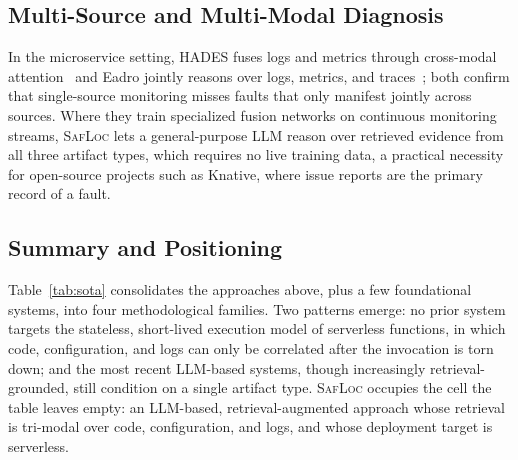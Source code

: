\documentclass[runningheads]{llncs}
\begin{document}
\subsection{Multi-Source and Multi-Modal Diagnosis}

In the microservice setting, HADES fuses logs and metrics through cross-modal attention~\cite{lee2023hades} and Eadro jointly reasons over logs, metrics, and traces~\cite{lee2023eadro}; both confirm that single-source monitoring misses faults that only manifest jointly across sources. Where they train specialized fusion networks on continuous monitoring streams, \textsc{SafLoc} lets a general-purpose LLM reason over retrieved evidence from all three artifact types, which requires no live training data, a practical necessity for open-source projects such as Knative, where issue reports are the primary record of a fault.

\subsection{Summary and Positioning}
\label{sec:relwork-summary}

Table~\ref{tab:sota} consolidates the approaches above, plus a few foundational systems, into four methodological families. Two patterns emerge: no prior system targets the stateless, short-lived execution model of serverless functions, in which code, configuration, and logs can only be correlated after the invocation is torn down; and the most recent LLM-based systems, though increasingly retrieval-grounded, still condition on a single artifact type. \textsc{SafLoc} occupies the cell the table leaves empty: an LLM-based, retrieval-augmented approach whose retrieval is tri-modal over code, configuration, and logs, and whose deployment target is serverless.
\end{document}
